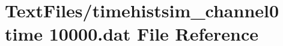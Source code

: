 \hypertarget{timehistsim__channel0_01time_0110000_8dat}{}\section{Text\+Files/timehistsim\+\_\+channel0 time 10000.dat File Reference}
\label{timehistsim__channel0_01time_0110000_8dat}
